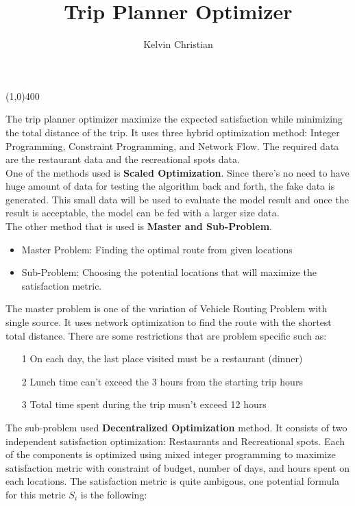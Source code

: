 \documentclass{article}
\title{Trip Planner Optimizer}
\author{Kelvin Christian}
\begin{document}
	\maketitle
	\begin{center}
		\line(1,0){400}
	\end{center}
	
	The trip planner optimizer maximize the expected satisfaction while minimizing the total distance of the trip. It uses three hybrid optimization method: Integer Programming, Constraint Programming, and Network Flow. The required data are the restaurant data and the recreational spots data. \\
	
	One of the methods used is \textbf{Scaled Optimization}. Since there's no need to have huge amount of data for testing the algorithm back and forth, the fake data is generated. This small data will be used to evaluate the model result and once the result is acceptable, the model can be fed with a larger size data. \\
	
	The other method that is used is \textbf{Master and Sub-Problem}.
	
	\begin{itemize}
		\item Master Problem: Finding the optimal route from given locations
		\item Sub-Problem: Choosing the potential locations that will maximize the satisfaction metric.
	\end{itemize}
	
	The master problem is one of the variation of Vehicle Routing Problem with single source. It uses network optimization to find the route with the shortest total distance. There are some restrictions that are problem specific such as:
	
	\begin{itemize}
		\item[1] On each day, the last place visited must be a restaurant (dinner)
		\item[2] Lunch time can't exceed the 3 hours from the starting trip hours
		\item[3] Total time spent during the trip musn't exceed 12 hours
	\end{itemize}
	
	The sub-problem used \textbf{Decentralized Optimization} method. It consists of two independent satisfaction optimization: Restaurants and Recreational spots. Each of the components is optimized using mixed integer programming to maximize satisfaction metric with constraint of budget, number of days, and hours spent on each locations. The satisfaction metric is quite ambigous, one potential formula for this metric $S_{i}$ is the following:
	
\end{document}
